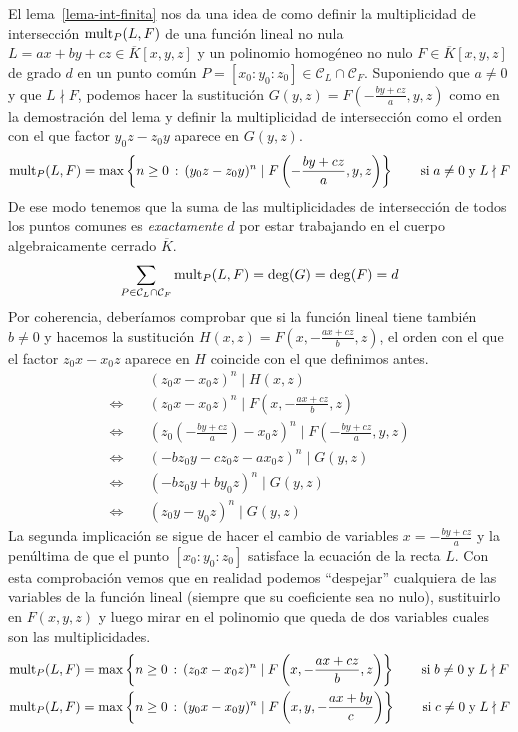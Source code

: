 \documentclass[a4paper, 11pt]{article}
\theoremstyle{plain}
\theoremstyle{definition}
\begin{document}
El lema~\ref{lema-int-finita} nos da una idea de como definir la multiplicidad de
intersección ${\rm mult}_P(L,F)$ de una función lineal no nula $L=ax+by+cz\in
\overline{K}[x,y,z]$ y un polinomio homogéneo no nulo $F\in\overline{K}[x,y,z]$
de grado $d$ en un punto común $P=[x_0:y_0:z_0]\in\mathcal{C}_L\cap\mathcal{C}_F$.
Suponiendo que $a\neq 0$ y que $L\nmid F$, podemos hacer la sustitución $G(y,z)=
F(-\frac{by+cz}{a},y,z)$ como en la demostración del lema y definir la multiplicidad
de intersección como el orden con el que factor $y_0z-z_0y$ aparece en $G(y,z)$.
\[
    {\rm mult}_P(L,F)=\max\left\{n\geq 0\,:\,(y_0z-z_0y)^n\mid F\left(-\frac{by+cz}{a},y,z\right)\right\}\qquad\text{si}\;a\neq0\;\text{y}\;L\nmid F
\]
De ese modo tenemos que la suma de las  multiplicidades de intersección de todos
los puntos comunes es \emph{exactamente} $d$ por estar trabajando en el cuerpo
algebraicamente cerrado $\overline{K}$.
\begin{equation}\label{eq-mult}
    \sum_{P\in\mathcal{C}_L\cap\mathcal{C}_F}{\rm mult}_P(L,F)=\deg(G)=\deg(F)=d
\end{equation}
Por coherencia, deberíamos comprobar que si la función lineal tiene también $b\neq 0$
y hacemos la sustitución $H(x,z)=F(x,-\frac{ax+cz}{b},z)$, el orden con el que el factor
$z_0x-x_0z$ aparece en $H$ coincide con el que definimos antes.
\[
\begin{aligned}
    & (z_0x-x_0z)^n\mid H(x,z) \\
\Longleftrightarrow\quad
    & (z_0x-x_0z)^n\mid F\left(x,-\frac{ax+cz}{b}, z\right) \\
\Longleftrightarrow\quad
    & \left(z_0(-\frac{by+cz}{a})-x_0z\right)^n\mid F\left(-\frac{by+cz}{a}, y, z\right) \\
\Longleftrightarrow\quad
    & (-bz_0y-cz_0z-ax_0z)^n\mid  G(y,z) \\
\Longleftrightarrow\quad
    & (-bz_0y+by_0z)^n\mid  G(y,z) \\
\Longleftrightarrow\quad
    & (z_0y-y_0z)^n\mid  G(y,z)
\end{aligned}
\]
La segunda implicación se sigue de hacer el cambio de variables $x=-\frac{by+cz}a$ y la
penúltima de que el punto $[x_0:y_0:z_0]$ satisface la ecuación de la recta $L$.
Con esta comprobación vemos que en realidad podemos ``despejar'' cualquiera de las
variables de la función lineal (siempre que su coeficiente sea no nulo), sustituirlo
en $F(x,y,z)$ y luego mirar en el polinomio que queda de dos variables cuales son las
multiplicidades.
\[
\begin{aligned}
    {\rm mult}_P(L,F) &=\max\left\{n\geq 0\,:\,(z_0x-x_0z)^n\mid F\left(x,-\frac{ax+cz}{b}, z\right)\right\}\qquad\text{si}\;b\neq0\;\text{y}\;L\nmid F \\
    {\rm mult}_P(L,F) &=\max\left\{n\geq 0\,:\,(y_0x-x_0y)^n\mid F\left(x,y,-\frac{ax+by}{c}\right)\right\}\qquad\text{si}\;c\neq0\;\text{y}\;L\nmid F \\
\end{aligned}
\]
\bigskip
\end{document}

